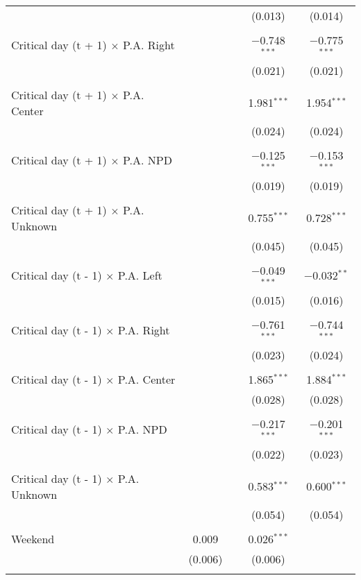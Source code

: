 \documentclass[
]{article}
\begin{document}
\begin{table}[!htbp]
{\begin{tabular}{@{\extracolsep{5pt}}lcccc}
  &  &  & (0.013) & (0.014) \\ 
  & & & & \\ 
 Critical day (t + 1) $\times$ P.A. Right &  &  & $-$0.748$^{***}$ & $-$0.775$^{***}$ \\ 
  &  &  & (0.021) & (0.021) \\ 
  & & & & \\ 
 Critical day (t + 1) $\times$ P.A. Center &  &  & 1.981$^{***}$ & 1.954$^{***}$ \\ 
  &  &  & (0.024) & (0.024) \\ 
  & & & & \\ 
 Critical day (t + 1) $\times$ P.A. NPD &  &  & $-$0.125$^{***}$ & $-$0.153$^{***}$ \\ 
  &  &  & (0.019) & (0.019) \\ 
  & & & & \\ 
 Critical day (t + 1) $\times$ P.A. Unknown &  &  & 0.755$^{***}$ & 0.728$^{***}$ \\ 
  &  &  & (0.045) & (0.045) \\ 
  & & & & \\ 
 Critical day (t - 1) $\times$ P.A. Left &  &  & $-$0.049$^{***}$ & $-$0.032$^{**}$ \\ 
  &  &  & (0.015) & (0.016) \\ 
  & & & & \\ 
 Critical day (t - 1) $\times$ P.A. Right &  &  & $-$0.761$^{***}$ & $-$0.744$^{***}$ \\ 
  &  &  & (0.023) & (0.024) \\ 
  & & & & \\ 
 Critical day (t - 1) $\times$ P.A. Center &  &  & 1.865$^{***}$ & 1.884$^{***}$ \\ 
  &  &  & (0.028) & (0.028) \\ 
  & & & & \\ 
 Critical day (t - 1) $\times$ P.A. NPD &  &  & $-$0.217$^{***}$ & $-$0.201$^{***}$ \\ 
  &  &  & (0.022) & (0.023) \\ 
  & & & & \\ 
 Critical day (t - 1) $\times$ P.A. Unknown &  &  & 0.583$^{***}$ & 0.600$^{***}$ \\ 
  &  &  & (0.054) & (0.054) \\ 
  & & & & \\ 
 Weekend & 0.009 &  & 0.026$^{***}$ &  \\ 
  & (0.006) &  & (0.006) &  \\ 
  & & & & \\ 

\end{tabular}}
\end{table}
\end{document}
